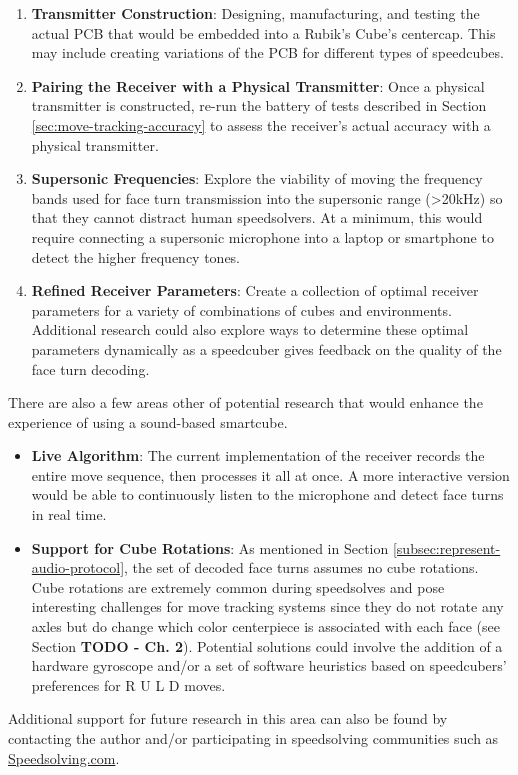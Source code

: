 \begin{enumerate}

    \item \textbf{Transmitter Construction}: Designing, manufacturing,
    and testing the actual PCB that would be embedded into a Rubik's
    Cube's centercap. This may include creating variations of the PCB
    for different types of speedcubes.

    \item \textbf{Pairing the Receiver with a Physical Transmitter}: Once
    a physical transmitter is constructed, re-run the battery of tests
    described in Section \ref{sec:move-tracking-accuracy} to assess the
    receiver's actual accuracy with a physical transmitter.

    \item \textbf{Supersonic Frequencies}: Explore the viability of
    moving the frequency bands used for face turn transmission into the
    supersonic range (>20kHz) so that they cannot distract human
    speedsolvers. At a minimum, this would require connecting a
    supersonic microphone into a laptop or smartphone to detect the
    higher frequency tones.

    \item \textbf{Refined Receiver Parameters}: Create a collection of
    optimal receiver parameters for a variety of combinations of cubes
    and environments. Additional research could also explore ways to
    determine these optimal parameters dynamically as a speedcuber
    gives feedback on the quality of the face turn decoding.

\end{enumerate}

There are also a few areas other of potential research that would
enhance the experience of using a sound-based smartcube.

\begin{itemize}

    \item \textbf{Live Algorithm}: The current implementation of the
    receiver records the entire move sequence, then processes it all at
    once. A more interactive version would be able to continuously
    listen to the microphone and detect face turns in real time.

    \item \textbf{Support for Cube Rotations}: As mentioned in Section
    \ref{subsec:represent-audio-protocol}, the set of decoded face
    turns assumes no cube rotations. Cube rotations are extremely
    common during speedsolves and pose interesting challenges for move
    tracking systems since they do not rotate any axles but do change
    which color centerpiece is associated with each face (see Section
    \textbf{TODO - Ch. 2}). Potential solutions could involve the
    addition of a hardware gyroscope and/or a set of software
    heuristics based on speedcubers' preferences for R U L D moves.

\end{itemize}

Additional support for future research in this area can also be found
by contacting the author and/or participating in speedsolving
communities such as
\href{https://www.speedsolving.com/}{Speedsolving.com}.